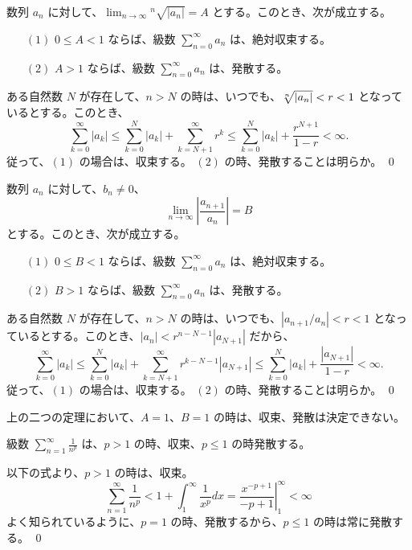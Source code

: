 \begin{thm} \label{thm:cauchy:criterion}
数列 ${a_n}$ に対して、${\displaystyle \lim_{n\to\infty}{}^n\!\!\sqrt{|a_n|} = A}$ とする。このとき、次が成立する。
\begin{itemize}
\item[$(1)$] $0\leq A < 1$ ならば、級数 $\sum_{n=0}^\infty a_n$ は、絶対収束する。
\item[$(2)$] $A > 1$ ならば、級数 $\sum_{n=0}^\infty a_n$ は、発散する。
\end{itemize}
\end{thm}
\proof
ある自然数 $N$ が存在して、$n>N$ の時は、いつでも、$\root n\of{|a_n|} < r < 1$ となっているとする。このとき、
$$\sum_{k=0}^\infty |a_k|\leq \sum_{k=0}^N|a_k| + \sum_{k=N+1}^\infty r^k \leq 
\sum_{k=0}^N|a_k|  + \frac{r^{N+1}}{1-r} < \infty.$$
従って、$(1)$ の場合は、収束する。
$(2)$ の時、発散することは明らか。
\qed

\begin{thm} \label{thm:dalembert:criterion}
数列 ${a_n}$ に対して、$b_n\neq 0$、
$$\lim_{n\to\infty}\left|\frac{a_{n+1}}{a_n}\right| = B$$
 とする。このとき、次が成立する。
\begin{itemize}
\item[$(1)$] $0\leq B < 1$ ならば、級数 $\sum_{n=0}^\infty a_n$ は、絶対収束する。
\item[$(2)$] $B > 1$ ならば、級数 $\sum_{n=0}^\infty a_n$ は、発散する。
\end{itemize}
\end{thm}
\proof
ある自然数 $N$ が存在して、$n>N$ の時は、いつでも、$|a_{n+1}/a_n| < r < 1$ となっているとする。このとき、$|a_n| < r^{n-N-1}|a_{N+1}|$ だから、
$$\sum_{k=0}^\infty |a_k|\leq \sum_{k=0}^N|a_k| + \sum_{k=N+1}^\infty r^{k-N-1}|a_{N+1}| \leq 
\sum_{k=0}^N|a_k|  + \frac{|a_{N+1}|}{1-r} < \infty.$$
従って、$(1)$ の場合は、収束する。
$(2)$ の時、発散することは明らか。
\qed

\medskip
上の二つの定理において、$A = 1$、$B = 1$ の時は、収束、発散は決定できない。

\begin{prop} \label{prop:1/np}
級数 ${\displaystyle \sum_{n = 1}^\infty \frac{1}{n^p}}$ は、$p > 1$ の時、収束、$p\leq 1$ の時発散する。
\end{prop}
\proof
以下の式より、$p > 1$ の時は、収束。
$$\sum_{n = 1}^\infty \frac{1}{n^p} < 1 + \int_1^\infty \frac{1}{x^p}dx = \left.\frac{x^{-p+1}}{-p+1}\right|_1^\infty < \infty$$
よく知られているように、$p = 1$ の時、発散するから、$p\leq 1$ の時は常に発散する。
\qed

